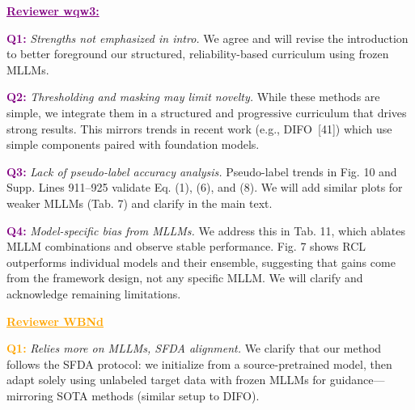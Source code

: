 \documentclass[10pt,twocolumn,letterpaper]{article}
\begin{document}
\noindent \textbf{\textcolor{purple}{\underline{Reviewer wqw3: }}}

\textcolor{purple}{\textbf{Q1:}} \textit{Strengths not emphasized in intro.} 
We agree and will revise the introduction to better foreground our structured, reliability-based curriculum using frozen MLLMs.

\textcolor{purple}{\textbf{Q2:}} \textit{Thresholding and masking may limit novelty.}
While these methods are simple, we integrate them in a structured and progressive curriculum that drives strong results. This mirrors trends in recent work (e.g., DIFO~[41]) which use simple components paired with foundation models.


\textcolor{purple}{\textbf{Q3:}} \textit{Lack of pseudo-label accuracy analysis.} 
Pseudo-label trends in Fig. 10 and Supp. Lines 911–925 validate Eq. (1), (6), and (8). We will add similar plots for weaker MLLMs (Tab. 7) and clarify in the main text.

\textcolor{purple}{\textbf{Q4:}} \textit{Model-specific bias from MLLMs.} We address this in Tab. 11, which ablates MLLM combinations and observe stable performance. Fig. 7 shows RCL outperforms individual models and their ensemble, suggesting that gains come from the framework design, not any specific MLLM. We will clarify and acknowledge remaining limitations.





\noindent \textbf{\textcolor{orange}{\underline{Reviewer WBNd}}}

\textcolor{orange}{\textbf{Q1:}} \textit{Relies more on MLLMs, SFDA alignment.}
We clarify that our method follows the SFDA protocol: we initialize from a source-pretrained model, then adapt solely using unlabeled target data with frozen MLLMs for guidance—mirroring SOTA methods (similar setup to DIFO).
\end{document}
